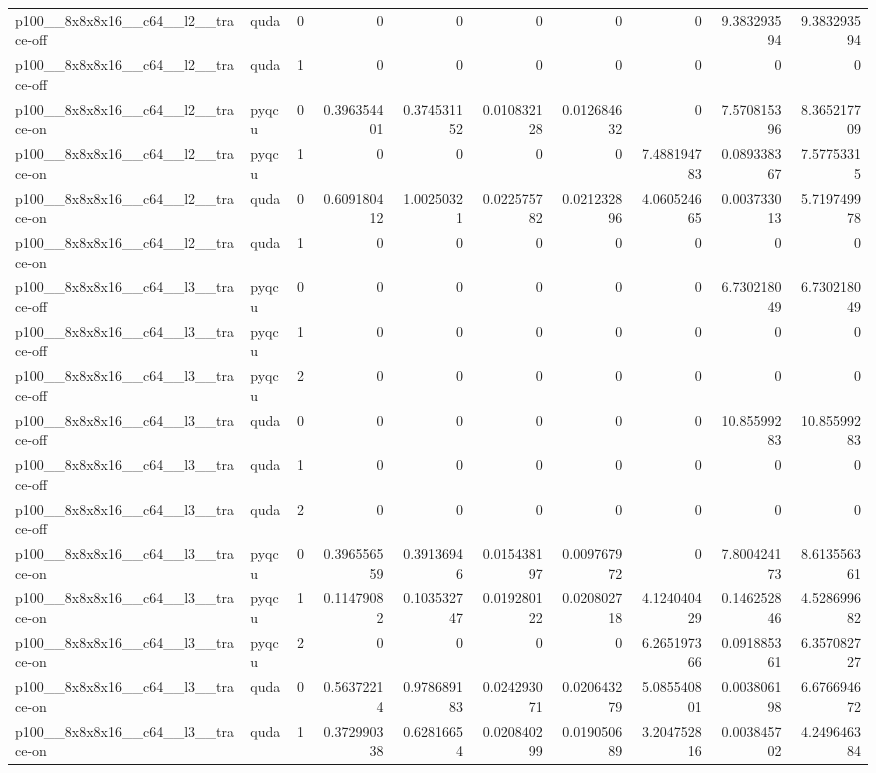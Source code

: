 \begin{table}[htbp]
\begin{tabular}{@{}llrrrrrrrr@{}}
p100\_\_8x8x8x16\_\_c64\_\_l2\_\_trace-off & quda & 0 & 0 & 0 & 0 & 0 & 0 & 9.383293594 & 9.383293594 \\
p100\_\_8x8x8x16\_\_c64\_\_l2\_\_trace-off & quda & 1 & 0 & 0 & 0 & 0 & 0 & 0 & 0 \\
p100\_\_8x8x8x16\_\_c64\_\_l2\_\_trace-on & pyqcu & 0 & 0.396354401 & 0.374531152 & 0.010832128 & 0.012684632 & 0 & 7.570815396 & 8.365217709 \\
p100\_\_8x8x8x16\_\_c64\_\_l2\_\_trace-on & pyqcu & 1 & 0 & 0 & 0 & 0 & 7.488194783 & 0.089338367 & 7.57753315 \\
p100\_\_8x8x8x16\_\_c64\_\_l2\_\_trace-on & quda & 0 & 0.609180412 & 1.00250321 & 0.022575782 & 0.021232896 & 4.060524665 & 0.003733013 & 5.719749978 \\
p100\_\_8x8x8x16\_\_c64\_\_l2\_\_trace-on & quda & 1 & 0 & 0 & 0 & 0 & 0 & 0 & 0 \\
p100\_\_8x8x8x16\_\_c64\_\_l3\_\_trace-off & pyqcu & 0 & 0 & 0 & 0 & 0 & 0 & 6.730218049 & 6.730218049 \\
p100\_\_8x8x8x16\_\_c64\_\_l3\_\_trace-off & pyqcu & 1 & 0 & 0 & 0 & 0 & 0 & 0 & 0 \\
p100\_\_8x8x8x16\_\_c64\_\_l3\_\_trace-off & pyqcu & 2 & 0 & 0 & 0 & 0 & 0 & 0 & 0 \\
p100\_\_8x8x8x16\_\_c64\_\_l3\_\_trace-off & quda & 0 & 0 & 0 & 0 & 0 & 0 & 10.85599283 & 10.85599283 \\
p100\_\_8x8x8x16\_\_c64\_\_l3\_\_trace-off & quda & 1 & 0 & 0 & 0 & 0 & 0 & 0 & 0 \\
p100\_\_8x8x8x16\_\_c64\_\_l3\_\_trace-off & quda & 2 & 0 & 0 & 0 & 0 & 0 & 0 & 0 \\
p100\_\_8x8x8x16\_\_c64\_\_l3\_\_trace-on & pyqcu & 0 & 0.396556559 & 0.39136946 & 0.015438197 & 0.009767972 & 0 & 7.800424173 & 8.613556361 \\
p100\_\_8x8x8x16\_\_c64\_\_l3\_\_trace-on & pyqcu & 1 & 0.11479082 & 0.103532747 & 0.019280122 & 0.020802718 & 4.124040429 & 0.146252846 & 4.528699682 \\
p100\_\_8x8x8x16\_\_c64\_\_l3\_\_trace-on & pyqcu & 2 & 0 & 0 & 0 & 0 & 6.265197366 & 0.091885361 & 6.357082727 \\
p100\_\_8x8x8x16\_\_c64\_\_l3\_\_trace-on & quda & 0 & 0.56372214 & 0.978689183 & 0.024293071 & 0.020643279 & 5.085540801 & 0.003806198 & 6.676694672 \\
p100\_\_8x8x8x16\_\_c64\_\_l3\_\_trace-on & quda & 1 & 0.372990338 & 0.62816654 & 0.020840299 & 0.019050689 & 3.204752816 & 0.003845702 & 4.249646384 \\

\end{tabular}
\end{table}
